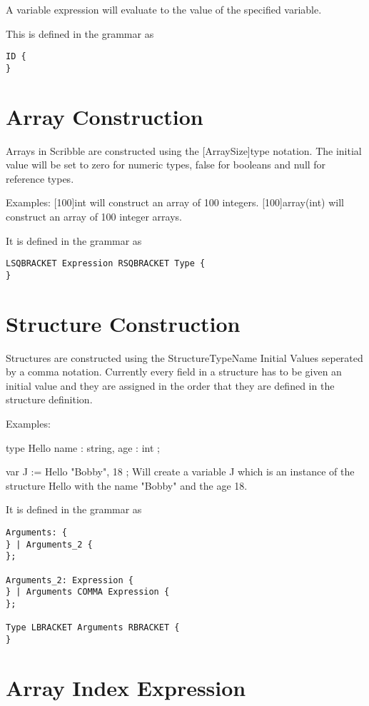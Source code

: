 \documentclass[]{final_report}
\begin{document}
A variable expression will evaluate to the value of the specified variable.

This is defined in the grammar as \begin{verbatim}
ID {
}
\end{verbatim}

\section{Array Construction}

Arrays in Scribble are constructed using the [ArraySize]type notation. The initial value will be set to zero for numeric types, false for booleans and null for reference types.

Examples:
[100]int will construct an array of 100 integers.
[100]array(int) will construct an array of 100 integer arrays.

It is defined in the grammar as
\begin{verbatim}
LSQBRACKET Expression RSQBRACKET Type {
}
\end{verbatim}

\section{Structure Construction}

Structures are constructed using the StructureTypeName { Initial Values seperated by a comma } notation. Currently every field in a structure has to be given an initial value and they are assigned in the order that they are defined in the structure definition.

Examples:

type Hello { 
	name : string,
	age : int
};

var J := Hello{ "Bobby", 18 };
Will create a variable J which is an instance of the structure Hello with the name "Bobby" and the age 18.

It is defined in the grammar as
\begin{verbatim}
Arguments: {
} | Arguments_2 {
};

Arguments_2: Expression {
} | Arguments COMMA Expression {
};

Type LBRACKET Arguments RBRACKET {
}
\end{verbatim}

\section{Array Index Expression}
\end{document}
